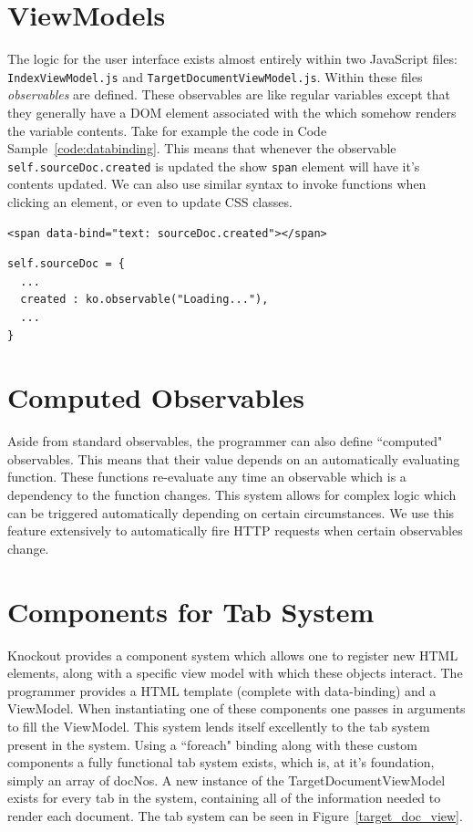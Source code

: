 \documentclass{l4proj}
\newcommand{\code}[1]{\texttt{#1}}
\newenvironment{codelisting}{\captionsetup{type=listing}}{}
\begin{document}
\section{ViewModels}
The logic for the user interface exists almost entirely within two JavaScript files: \code{IndexViewModel.js} and \code{TargetDocumentViewModel.js}. Within these files \textit{observables} are defined. These observables are like regular variables except that they generally have a DOM element associated with the which somehow renders the variable contents.
Take for example the code in Code Sample~\ref{code:databinding}. This means that whenever the observable \code{self.sourceDoc.created} is updated the show \code{span} element will have it's contents updated. We can also use similar syntax to invoke functions when clicking an element, or even to update CSS classes.
\begin{codelisting}
\begin{verbatim}
<span data-bind="text: sourceDoc.created"></span>
\end{verbatim}
\begin{verbatim}
self.sourceDoc = {
  ...
  created : ko.observable("Loading..."),
  ...
}
\end{verbatim}
\label{code:databinding}
\end{codelisting}

\section{Computed Observables}
Aside from standard observables, the programmer can also define ``computed" observables. This means that their value depends on an automatically evaluating function. These functions re-evaluate any time an observable which is a dependency to the function changes. This system allows for complex logic which can be triggered automatically depending on certain circumstances.
We use this feature extensively to automatically fire HTTP requests when certain observables change.

\section{Components for Tab System}
Knockout provides a component system which allows one to register new HTML elements, along with a specific view model with which these objects interact. The programmer provides a HTML template (complete with data-binding) and a ViewModel. When instantiating one of these components one passes in arguments to fill the ViewModel.
This system lends itself excellently to the tab system present in the system. Using a ``foreach" binding along with these custom components a fully functional tab system exists, which is, at it's foundation, simply an array of docNos. A new instance of the TargetDocumentViewModel exists for every tab in the system, containing all of the information needed to render each document. The tab system can be seen in Figure~\ref{target_doc_view}.
\end{document}
